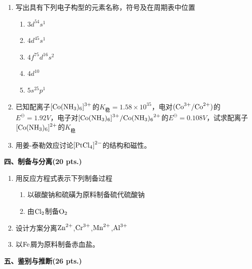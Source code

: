 \begin{enumerate}[label=\arabic*., start=1, itemsep=1.5ex]
\begin{enumerate}[label=(\arabic*), itemsep=1ex]
    \end{enumerate}
    \item 写出具有下列电子构型的元素名称，符号及在周期表中位置
    \begin{enumerate}[label=(\arabic*), itemsep=1ex]
        \item $3d^54s^1$
        \item $4d^45s^1$
        \item $4f^75d^16s^2$
        \item $4d^{10}$
        \item $5s^25p^1$
    \end{enumerate}
    \item 已知配离子$\ce{[Co(NH3)6]^3+}$的$K_{\text{稳}}=1.58\times10^{35}$，电对$\ce{(Co^{3+}/Co^{2+})}$的$E^\ominus=1.92V$，电子对$\ce{[Co(NH3)6]^3+/Co(NH3)6^2+}$的$E^\ominus=0.108V$，试求配离子$\ce{[Co(NH3)6]^{2+}}$的$K_{\text{稳}}$
    \item 用姜-泰勒效应讨论$\ce{[PtCl4]^2-}$的结构和磁性。
\end{enumerate}

\vspace{0.5cm}
\noindent\textbf{四、制备与分离(20 pts.)}

\begin{enumerate}[label=\arabic*., start=1, itemsep=1.5ex]
    \item 用反应方程式表示下列制备过程
    \begin{enumerate}[label=(\arabic*), itemsep=1ex]
        \item 以碳酸钠和硫磺为原料制备硫代硫酸钠
        \item 由$\ce{Cl2}$制备$\ce{O2}$
    \end{enumerate}
    \item 设计方案分离$\ce{Zn^2+}$,$\ce{Cr^3+}$,$\ce{Mn^2+}$,$\ce{Al^3+}$
    \item 以$\ce{Fe}$屑为原料制备赤血盐。
\end{enumerate}

\vspace{0.5cm}
\noindent\textbf{五、鉴别与推断(26 pts.)}

